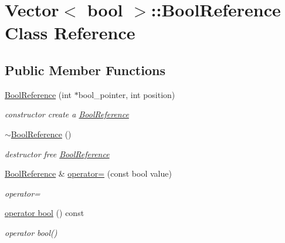\hypertarget{classVector_3_01bool_01_4_1_1BoolReference}{}\section{Vector$<$ bool $>$\+:\+:Bool\+Reference Class Reference}
\label{classVector_3_01bool_01_4_1_1BoolReference}
\subsection*{Public Member Functions}
\begin{DoxyCompactItemize}
\item 
\hyperlink{classVector_3_01bool_01_4_1_1BoolReference_a7b319cb4b874379cbeb6d303b5d323eb}{Bool\+Reference} (int $\ast$bool\+\_\+pointer, int position)
\begin{DoxyCompactList}\small\item\em constructor  create a \hyperlink{classVector_3_01bool_01_4_1_1BoolReference}{Bool\+Reference} \end{DoxyCompactList}\item 
\mbox{\label{classVector_3_01bool_01_4_1_1BoolReference_a9a6a68833363cc0ed810862d38f22f0a}} 
\hyperlink{classVector_3_01bool_01_4_1_1BoolReference_a9a6a68833363cc0ed810862d38f22f0a}{$\sim$\+Bool\+Reference} ()
\begin{DoxyCompactList}\small\item\em destructor  free \hyperlink{classVector_3_01bool_01_4_1_1BoolReference}{Bool\+Reference} \end{DoxyCompactList}\item 
\hyperlink{classVector_3_01bool_01_4_1_1BoolReference_a7b319cb4b874379cbeb6d303b5d323eb}{Bool\+Reference} \& \hyperlink{classVector_3_01bool_01_4_1_1BoolReference_a5d76de9a5ad35583fe447af9951d1491}{operator=} (const bool value)
\begin{DoxyCompactList}\small\item\em operator= \end{DoxyCompactList}\item 
\hyperlink{classVector_3_01bool_01_4_1_1BoolReference_a56531a72bf638739e704e8fb07b0f394}{operator bool} () const
\begin{DoxyCompactList}\small\item\em operator bool() \end{DoxyCompactList}\end{DoxyCompactItemize}
